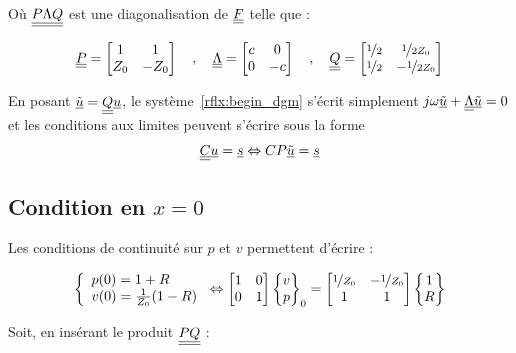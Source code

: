 Où $\underline{\underline{P\Lambda Q}}$ est une diagonalisation de $\underline{\underline{F}}$ telle que :

\[
\underline{\underline{P}} = \begin{bmatrix}1 & 1\\Z_0 & -Z_0\end{bmatrix} \quad,\quad
\underline{\underline{\Lambda}} = \begin{bmatrix}c & 0\\0 & -c\end{bmatrix} \quad,\quad
\underline{\underline{Q}} = \begin{bmatrix}
	\nicefrac{1}{2} & \nicefrac{1}{2Z_0}\\
	\nicefrac{1}{2} & -\nicefrac{1}{2Z_0}\\
\end{bmatrix}
\]

En posant $\underline{\tilde{u}} = \underline{\underline{Q}}\underline{u}$, le système~\eqref{rflx:begin_dgm} s'écrit simplement $j\omega\underline{\tilde{u}} +
\underline{\underline{\Lambda}}\underline{\tilde{u}} = 0$ et les conditions aux limites peuvent s'écrire sous la forme $$\underline{\underline{C}}\underline{u} = \underline{s} \Leftrightarrow
CP\underline{\tilde{u}} = \underline{s}$$

\subsection{Condition en $x=0$}

Les conditions de continuité sur $p$ et $v$ permettent d'écrire :

\begin{equation*}
	\left\{
		\begin{array}{l}
			p(0) = 1 + R\\
			v(0) = \frac{1}{Z_0}(1-R)
		\end{array}
	\right.
	\Leftrightarrow
	\begin{bmatrix}
		1 & 0\\
		0 & 1
	\end{bmatrix}
	\begin{Bmatrix}
		v\\
		p
	\end{Bmatrix}_0 = 
	\begin{bmatrix}
		\nicefrac{1}{Z_0} & -\nicefrac{1}{Z_0}\\
		1 & 1
	\end{bmatrix}
	\begin{Bmatrix}
		1\\
		R
	\end{Bmatrix}
\end{equation*}

Soit, en insérant le produit $\underline{\underline{PQ}}$ :

